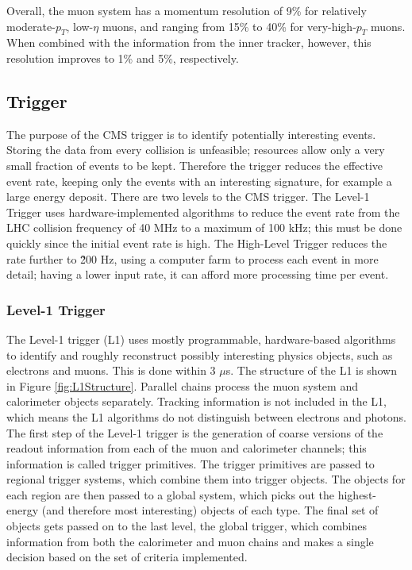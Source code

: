 Overall, the muon system has a momentum resolution 
of 9\% for relatively moderate-$p_T$, low-$\eta$ muons, 
and ranging from 15\% to 40\% for very-high-$p_T$ muons.  
When combined with the information from the inner tracker, 
however, this resolution improves to 
1\% and 5\%, respectively.  

\subsection{Trigger}
\label{exp:trigger}
The purpose of the CMS trigger is to 
identify potentially interesting events.  
Storing the data from every collision is unfeasible; 
resources allow only a very small fraction of events to be kept.  
Therefore the trigger reduces the effective event rate, 
keeping only the events with an interesting signature, 
for example a large energy deposit.  
There are two levels to the CMS trigger.  
The Level-1 Trigger uses hardware-implemented algorithms to 
reduce the event rate from the LHC collision frequency of 40 MHz 
to a maximum of 100 kHz; 
this must be done quickly since the initial event rate is high. 
The High-Level Trigger reduces the rate further to \~200 Hz, %
using a computer farm to process each event in more detail; 
having a lower input rate, it can afford more processing time per event.  


\subsubsection{Level-1 Trigger}
\label{exp:L1}

The Level-1 trigger (L1) \cite{TriggerTDR} 
uses mostly programmable, hardware-based algorithms 
to identify and roughly reconstruct possibly interesting physics objects, 
such as electrons and muons.  
This is done within 3 $\mu$s.  
The structure of the L1 is shown in Figure \ref{fig:L1Structure}.  
Parallel chains process the muon system and calorimeter objects separately. 
Tracking information is not included in the L1, 
which means the L1 algorithms do not distinguish 
between electrons and photons. 
The first step of the Level-1 trigger is the generation 
of coarse versions of the readout information 
from each of the muon and calorimeter channels; 
this information is called trigger primitives.  
The trigger primitives are passed to regional trigger systems, 
which combine them into trigger objects.  
The objects for each region are then passed to a global system, 
which picks out the highest-energy (and therefore most interesting) 
objects of each type.
The final set of objects gets passed on to the last level, 
the global trigger, which combines information from both 
the calorimeter and muon chains 
and makes a single decision based on the set of criteria implemented.  

